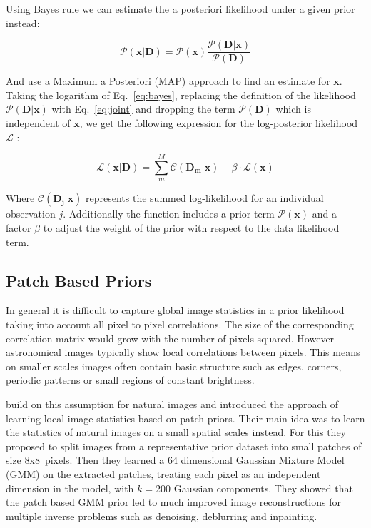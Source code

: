 \documentclass[twocolumn]{aastex631}
\begin{document}
    Using Bayes rule we can estimate the a posteriori likelihood under a given prior instead:

    \begin{equation}
        \label{eq:bayes}
        \mathcal{P}(\mathbf{x}|\textbf{D}) = \mathcal{P}(\mathbf{x} ) \frac{\mathcal{P}(\textbf{D} |\mathbf{x})}{ \mathcal{P} (\textbf{D})}
    \end{equation}

    And use a Maximum a Posteriori (MAP) approach to find an estimate for $\mathbf{x}$.
    Taking the logarithm of Eq.~\ref{eq:bayes}, replacing the definition of the likelihood $\mathcal{P}(\mathbf{D}|\mathbf{x})$ with Eq.~\ref{eq:joint} and dropping the term $\mathcal{P}(\mathbf{D})$
    which is independent of $\mathbf{x}$, we get the following expression for the log-posterior
    likelihood $\mathcal{L}$ :
    
    \begin{equation}
        \label{eq:total}
        \mathcal{L}\left(\mathbf{x} | \mathbf{D} \right) = \sum_m^M \mathcal{C}\left( \mathbf{D_m} | \mathbf{x} \right) - \beta \cdot \mathcal{L}(\mathbf{x})
    \end{equation}

    Where $\mathcal{C}\left( \mathbf{D_j} | \mathbf{x} \right)$ represents the summed log-likelihood
    for an individual observation $j$. Additionally the function includes a prior term $\mathcal{P}(\mathbf{x})$
    and a factor $\beta$ to adjust the weight of the prior with respect to the data likelihood term.

    \subsection{Patch Based Priors}
    In general it is difficult to capture global image statistics in a prior likelihood
    taking into account all pixel to pixel correlations. The size of the corresponding
    correlation matrix would grow with the number of pixels squared. However
    astronomical images typically show local correlations between pixels.
    This means on smaller scales images often contain basic structure such as 
    edges, corners, periodic patterns or small regions of constant brightness.

    \cite{Zoran2011} build on this assumption for natural images and introduced the approach of
    learning local image statistics based on patch priors. Their main idea
    was to learn the statistics of natural images on a small
    spatial scales instead. For this they proposed to split images from a
    representative prior dataset into small patches of size 8x8~pixels.
    Then they learned a 64 dimensional Gaussian Mixture Model (GMM) on the
    extracted patches, treating each pixel as an independent dimension in
    the model, with $k=200$ Gaussian components. They showed that the patch based GMM
    prior led to much improved image reconstructions for multiple inverse problems 
    such as denoising, deblurring and inpainting.
    
\end{document}
